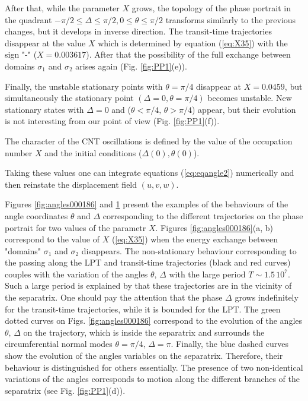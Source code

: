 \begin{figure}
\label{fig:angles00025}
\end{figure}

After that, while the parameter $X$ grows, the topology of the phase portrait in the quadrant $-\pi/2 \le \Delta \le \pi/2, 0 \le \theta \le \pi/2$ transforms similarly to the previous changes, but it develops in inverse direction.
The transit-time trajectories disappear at the value $X$ which is determined by equation (\ref{eq:X35}) with the sign "-" ($X=0.003617$).
After that the possibility of the full exchange between domains $\sigma_{1}$ and $\sigma_{2}$ arises again (Fig. \ref{fig:PP1}(e)).

Finally, the unstable stationary points with $\theta = \pi/4$ disappear at $X=0.0459$, but simultaneously the stationary point $(\Delta =0, \theta = \pi/4)$ becomes unstable.
New stationary states with $\Delta = 0$ and ($\theta < \pi/4, \, \theta > \pi/4$) appear, but their evolution is not interesting from our point of view (Fig. \ref{fig:PP1}(f)).

The character of the CNT oscillations is defined by the value of the occupation number $X$ and the initial conditions ($\Delta(0), \theta(0)$).

Taking these values one can integrate equations (\ref{eq:eqangle2}) numerically and then reinstate the displacement field $(u, v, w)$.

Figures \ref{fig:angles000186} and \ref{fig:angles00025} present the examples of the behaviours of the angle coordinates $\theta$ and $\Delta$ corresponding to the different trajectories on the phase portrait for two values of the parametr $X$.
Figures \ref{fig:angles000186}(a, b) correspond to the value of $X$ (\ref{eq:X35}) when the energy exchange between "domains" $\sigma_{1}$ and $\sigma_{2}$ disappears.
The non-stationary behaviour corresponding to the passing along the LPT and transit-time trajectories (black and red curves) couples with the variation of the angles $\theta, \, \Delta$ with the large period $T \sim 1.5 \, 10^{7}$.
Such a large period is explained by that these trajectories are in the vicinity of the separatrix.
One should pay the attention that the phase $\Delta$ grows indefinitely for the transit-time trajectories, while it is bounded for the LPT.
The green dotted curves on Figs. \ref{fig:angles000186} correspond to the evolution of the angles $\theta, \, \Delta$ on the trajectory, which is inside the separatrix and surrounds the circumferential normal modes $\theta=\pi/4, \, \Delta=\pi$.
Finally, the blue dashed curves show the evolution of the angles variables on the separatrix.
Therefore, their behaviour is distinguished for others essentially.
The presence of two non-identical variations of the angles corresponds to motion along the different branches of the separatrix (see Fig. \ref{fig:PP1}(d)).

